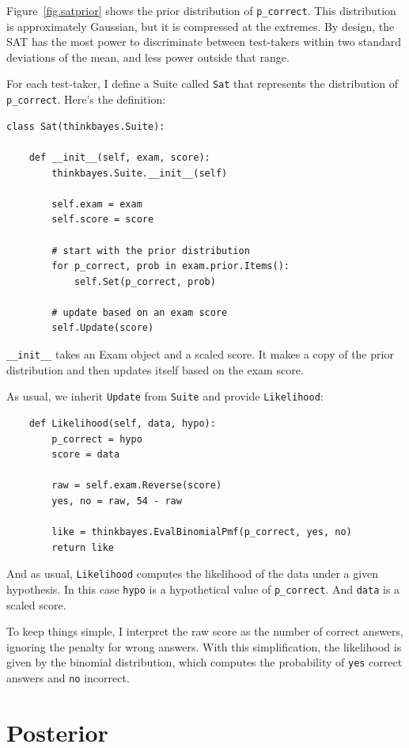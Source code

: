 \documentclass[12pt]{book}
\begin{document}
Figure~\ref{fig.satprior} shows the prior distribution of
\verb"p_correct".  This distribution is approximately Gaussian, but it
is compressed at the extremes.  By design, the SAT has the most power
to discriminate between test-takers within two standard deviations of
the mean, and less power outside that range.

For each test-taker, I define a Suite called {\tt Sat} that
represents the distribution of \verb"p_correct".  Here's the definition:

\begin{verbatim}
class Sat(thinkbayes.Suite):

    def __init__(self, exam, score):
        thinkbayes.Suite.__init__(self)

        self.exam = exam
        self.score = score

        # start with the prior distribution
        for p_correct, prob in exam.prior.Items():
            self.Set(p_correct, prob)

        # update based on an exam score
        self.Update(score)
\end{verbatim}

\verb"__init__" takes an Exam object and a scaled score.  It makes a
copy of the prior distribution and then updates itself based on the
exam score.

As usual, we inherit {\tt Update} from {\tt Suite} and provide
{\tt Likelihood}:

\begin{verbatim}
    def Likelihood(self, data, hypo):
        p_correct = hypo
        score = data

        raw = self.exam.Reverse(score)
        yes, no = raw, 54 - raw

        like = thinkbayes.EvalBinomialPmf(p_correct, yes, no)
        return like
\end{verbatim}

And as usual, {\tt Likelihood} computes the likelihood of the data
under a given hypothesis.  In this case {\tt hypo} is a hypothetical
value of \verb"p_correct".  And {\tt data} is a scaled score.

To keep things simple, I interpret the raw score as the number of
correct answers, ignoring the penalty for wrong answers.  With
this simplification, the likelihood is given by the binomial
distribution, which computes the probability of {\tt yes} correct
answers and {\tt no} incorrect.


\section{Posterior}
\end{document}
